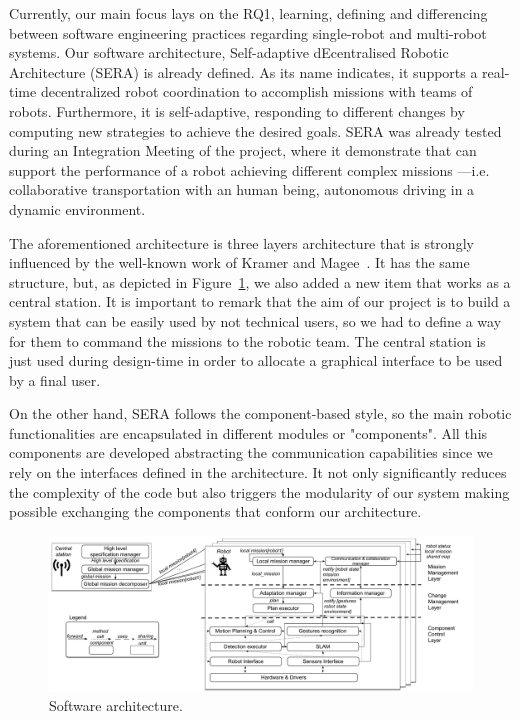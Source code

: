 Currently, our main focus lays on the RQ1, learning, defining and differencing between software engineering practices regarding single-robot and multi-robot systems.
Our software architecture, Self-adaptive dEcentralised Robotic Architecture (SERA) is already defined.
As its name indicates, it supports a real-time decentralized robot coordination to accomplish missions with teams of robots. 
Furthermore, it is self-adaptive, responding to different changes by computing new strategies to achieve the desired goals.
SERA was already tested during an Integration Meeting of the project, where it demonstrate that can support the performance of a robot achieving different complex missions ---i.e. collaborative transportation with an human being, autonomous driving in a dynamic environment.

The aforementioned architecture is three layers architecture that is strongly influenced by the well-known work of Kramer and Magee~\cite{kramer}.
It has the same structure, but, as depicted in Figure~\ref{fig:arch}, we also added a new item that works as a central station.
It is important to remark that the aim of our project is to build a system that can be easily used by not technical users, so we had to define a way for them to command the missions to the robotic team.
The central station is just used during design-time in order to allocate a graphical interface to be used by a final user.

On the other hand, SERA follows the component-based style, so the main robotic functionalities are encapsulated in different modules or "components".
All this components are developed abstracting the communication capabilities since we rely on the interfaces defined in the architecture.
It not only significantly reduces the complexity of the code but also triggers the modularity of our system making possible exchanging the components that conform our architecture.

\begin{figure}[!t]
\begin{center}
\includegraphics[width=1\linewidth]{Figures/InstanceMultiRobot_Graffle.pdf}
\caption{Software architecture.}
\label{fig:arch}
\end{center}
\end{figure}

